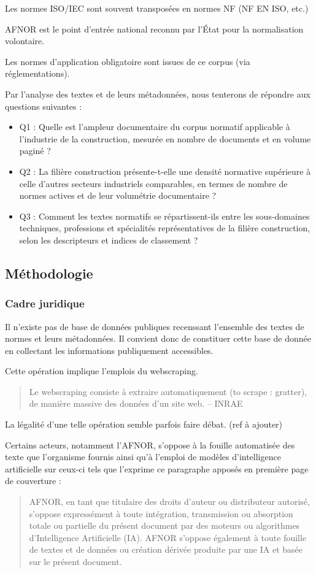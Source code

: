 \documentclass[a4paper,12pt]{article}
\begin{document}
Les normes ISO/IEC sont souvent transposées en normes NF (NF EN ISO, etc.)

AFNOR est le point d’entrée national reconnu par l’État pour la normalisation volontaire.

Les normes d’application obligatoire sont issues de ce corpus (via réglementations).

Par l'analyse des textes et de leurs métadonnées, nous tenterons de répondre aux questions suivantes :

\begin{itemize}
\item Q1 : Quelle est l’ampleur documentaire du corpus normatif applicable à l’industrie de la construction, mesurée en nombre de documents et en volume paginé ?
\item Q2 : La filière construction présente-t-elle une densité normative supérieure à celle d’autres secteurs industriels comparables, en termes de nombre de normes actives et de leur volumétrie documentaire ?
\item Q3 : Comment les textes normatifs se répartissent-ils entre les sous-domaines techniques, professions et spécialités représentatives de la filière construction, selon les descripteurs et indices de classement ?
\end{itemize}
\subsection{Méthodologie}
\label{sec:org305eb21}
\subsubsection{Cadre juridique}
\label{sec:orgfb3038e}
Il n'existe pas de base de données publiques recenssant l'ensemble des textes de normes et leurs métadonnées. Il convient donc de constituer cette base de donnée en collectant les informations publiquement accessibles.

Cette opération implique l'emplois du webscraping.

\begin{quote}
Le webscraping consiste à extraire automatiquement (to scrape : gratter), de manière massive des données d'un site web. -- INRAE\autocite{quesnevilleRecommandationsUsagesWebscraping2024}
\end{quote}

La légalité d'une telle opération semble parfois faire débat. (ref à ajouter)

Certains acteurs, notamment l'AFNOR, s'oppose à la fouille automatisée des texte que l'organisme fournis ainsi qu'à l'emploi de modèles d'intelligence artificielle sur ceux-ci tels que l'exprime ce paragraphe apposés en première page de couverture :
\begin{quote}
AFNOR, en tant que titulaire des droits d’auteur ou distributeur autorisé, s’oppose expressément à toute intégration, transmission ou absorption totale ou partielle du présent document par des moteurs ou algorithmes d’Intelligence Artificielle (IA). AFNOR s’oppose également à toute fouille de textes et de données ou création dérivée produite par une IA et basée sur le présent document.
\end{quote}
\end{document}
